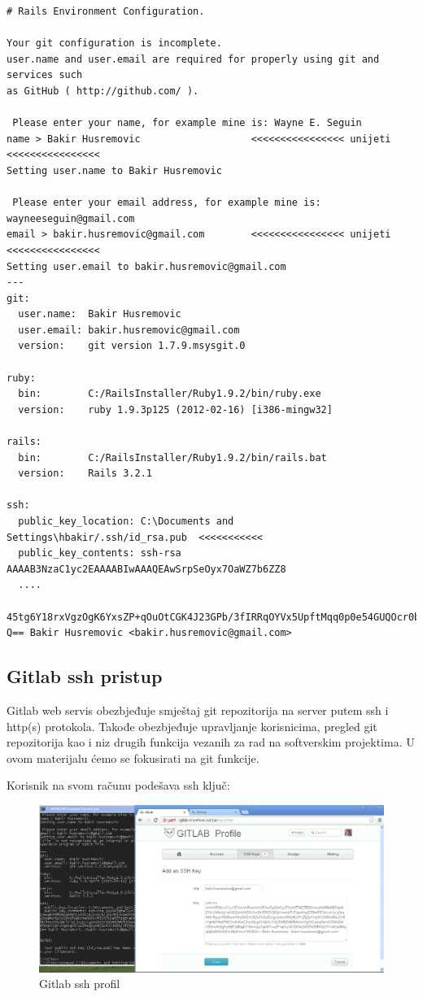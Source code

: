 \documentclass[times, utf8, seminar]{fit}
\begin{document}
\begin{lstlisting}
# Rails Environment Configuration.

Your git configuration is incomplete.
user.name and user.email are required for properly using git and services such
as GitHub ( http://github.com/ ).

 Please enter your name, for example mine is: Wayne E. Seguin
name > Bakir Husremovic                   <<<<<<<<<<<<<<<< unijeti <<<<<<<<<<<<<<<<
Setting user.name to Bakir Husremovic

 Please enter your email address, for example mine is: wayneeseguin@gmail.com
email > bakir.husremovic@gmail.com        <<<<<<<<<<<<<<<< unijeti <<<<<<<<<<<<<<<<
Setting user.email to bakir.husremovic@gmail.com
---
git:
  user.name:  Bakir Husremovic
  user.email: bakir.husremovic@gmail.com
  version:    git version 1.7.9.msysgit.0

ruby:
  bin:        C:/RailsInstaller/Ruby1.9.2/bin/ruby.exe
  version:    ruby 1.9.3p125 (2012-02-16) [i386-mingw32]

rails:
  bin:        C:/RailsInstaller/Ruby1.9.2/bin/rails.bat
  version:    Rails 3.2.1

ssh:
  public_key_location: C:\Documents and Settings\hbakir/.ssh/id_rsa.pub  <<<<<<<<<<<
  public_key_contents: ssh-rsa AAAAB3NzaC1yc2EAAAABIwAAAQEAwSrpSeOyx7OaWZ7b6ZZ8
  ....
  45tg6Y18rxVgzOgK6YxsZP+qOuOtCGK4J23GPb/3fIRRqOYVx5UpftMqq0p0e54GUQOcr0bS+/ooYNC
Q== Bakir Husremovic <bakir.husremovic@gmail.com>
\end{lstlisting}

\subsection{Gitlab ssh pristup}

Gitlab web servis obezbjeđuje smještaj git repozitorija na server putem ssh i http(s) protokola. 
Takođe obezbjeđuje upravljanje korisnicima, pregled git repozitorija kao i niz drugih funkcija vezanih za rad na softverskim projektima.
U ovom materijalu ćemo se fokusirati na git funkcije. 

Korisnik na svom računu podešava ssh ključ:

\begin{figure}[H]
\centering
\includegraphics[width=15cm]{img/gitlab_ssh_profile.png}
\caption{Gitlab ssh profil}
\end{figure}
\end{document}
